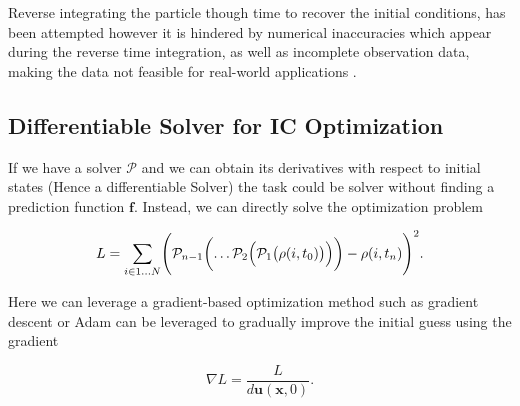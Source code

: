 \documentclass{article}
\begin{document}
Reverse integrating the particle though time to recover the initial conditions, has been attempted \citep{nusser1992tracing} however it is hindered by numerical inaccuracies which appear during the reverse time integration, as well as incomplete observation data, making the data not feasible for real-world applications \citep{jasche2013bayesian}.

\subsection{Differentiable Solver for IC Optimization}
\label{IC-opt}

If we have a solver $\mathcal{P}$ and we can obtain its derivatives with respect to initial states (Hence a differentiable Solver) the task could be solver without finding a prediction function $\mathbf{f}$. Instead, we can directly solve the optimization problem

\begin{equation}
    L = \sum_{i \in 1 \dots N} \Biggl(\mathcal{P}_{n-1}\biggl( \dots \mathcal{P}_2\Bigl(\mathcal{P}_1\bigl(\rho(i, t_{0})\bigr)\Bigr)\biggr) - \rho(i, t_n)\Biggr)^2.
\end{equation}

Here we can leverage a gradient-based optimization method such as gradient descent or Adam can be leveraged to gradually improve the initial guess using the gradient

\begin{equation}
    \nabla L = \frac{L}{d \mathbf{u}(\mathbf{x}, 0)}.
\end{equation}
\end{document}
